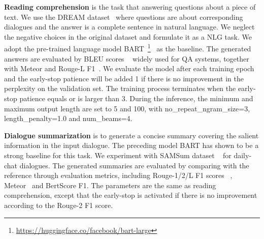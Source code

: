 \textbf{Reading comprehension} is the task that answering questions about a piece of text. We use the DREAM dataset~\cite{sun2019dream} where questions are about corresponding dialogues and the answer is a complete sentence in natural language. We neglect the negative choices in the original dataset and formulate it as a NLG task. We adopt the pre-trained language model BART~\footnote{\url{https://huggingface.co/facebook/bart-large}}~\cite{lewis2020bart} as the baseline.
The generated answers are evaluated by BLEU scores%
~\cite{papineni2002bleu} widely used for QA systems, together with Meteor and Rouge-L F1~\cite{fabbri2021summeval}.
We evaluate the model after each training epoch and the early-stop patience will be added 1 if there is no improvement 
in the perplexity on the validation set. The training process terminates when the early-stop patience equals or is larger than 3.  
During the inference, the minimum and maximum output length are set to 5 and 100, with no\_repeat\_ngram\_size=3, length\_penalty=1.0 and num\_beams=4.



\textbf{Dialogue summarization} is to generate a concise summary covering the salient information in the input dialogue. The preceding model BART has shown to be a strong baseline for this task.%
We experiment with  %
SAMSum dataset
~\cite{gliwa2019samsum} for daily-chat dialogues. 
The generated summaries are evaluated by comparing with the reference through evaluation metrics, including Rouge-1/2/L F1 scores %
~\cite{lin2004rouge}, Meteor~\cite{banerjee2005meteor} and BertScore F1. %
The parameters are the same as reading comprehension, except that the early-stop is activated if there is no improvement according to the Rouge-2 F1 score. 


